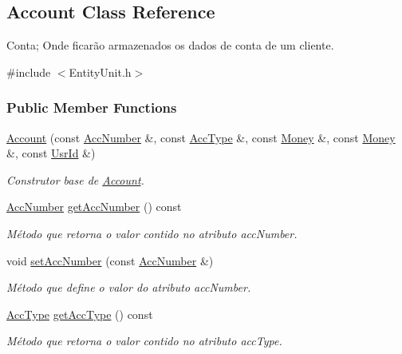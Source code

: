 \hypertarget{classAccount}{\subsection{Account Class Reference}
\label{d7/d10/classAccount}
}


Conta; Onde ficarão armazenados os dados de conta de um cliente.  




{\ttfamily \#include $<$Entity\-Unit.\-h$>$}

\subsubsection*{Public Member Functions}
\begin{DoxyCompactItemize}
\item 
\hyperlink{classAccount_a94113be123fc89c3de8461cbb8251c83}{Account} (const \hyperlink{classAccNumber}{Acc\-Number} \&, const \hyperlink{classUsrType}{Acc\-Type} \&, const \hyperlink{classMoney}{Money} \&, const \hyperlink{classMoney}{Money} \&, const \hyperlink{classUsrId}{Usr\-Id} \&)
\begin{DoxyCompactList}\small\item\em Construtor base de \hyperlink{classAccount}{Account}. \end{DoxyCompactList}\item 
\hyperlink{classAccNumber}{Acc\-Number} \hyperlink{classAccount_a74f26f24e13e66a055bb8441dfb3d881}{get\-Acc\-Number} () const 
\begin{DoxyCompactList}\small\item\em Método que retorna o valor contido no atributo acc\-Number. \end{DoxyCompactList}\item 
void \hyperlink{classAccount_a3e669090168f13d2a8269af456546a1e}{set\-Acc\-Number} (const \hyperlink{classAccNumber}{Acc\-Number} \&)
\begin{DoxyCompactList}\small\item\em Método que define o valor do atributo acc\-Number. \end{DoxyCompactList}\item 
\hyperlink{classUsrType}{Acc\-Type} \hyperlink{classAccount_a34e1f7e507d7abdf575e4833d6f8d36b}{get\-Acc\-Type} () const 
\begin{DoxyCompactList}\small\item\em Método que retorna o valor contido no atributo acc\-Type. \end{DoxyCompactList}\item 

\end{DoxyCompactItemize}
